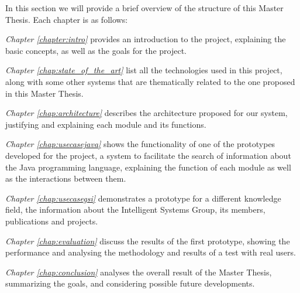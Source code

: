 In this section we will provide a brief overview of the structure of this Master Thesis. Each chapter is as follows:

\emph{Chapter \ref{chapter:intro}} provides an introduction to the project, explaining the basic concepts, as well as the goals for the project.

\emph{Chapter \ref{chap:state_of_the_art}} list all the technologies used in this project, along with some other systems that are thematically related to the one proposed in this Master Thesis.

\emph{Chapter \ref{chap:architecture}} describes the architecture proposed for our system, justifying and explaining each module and its functions.

\emph{Chapter \ref{chap:usecasejava}} shows the functionality of one of the prototypes developed for the project, a system to facilitate the search of information about the Java programming language, explaining the function of each module as well as the interactions between them.

\emph{Chapter \ref{chap:usecasegsi}} demonstrates a prototype for a different knowledge field, the information about the Intelligent Systems Group, its members, publications and projects. 

\emph{Chapter \ref{chap:evaluation}} discuss the results of the first prototype, showing the performance and analysing the methodology and results of a test with real users.

\emph{Chapter \ref{chap:conclusion}} analyses the overall result of the Master Thesis, summarizing the goals, and considering possible future developments.

